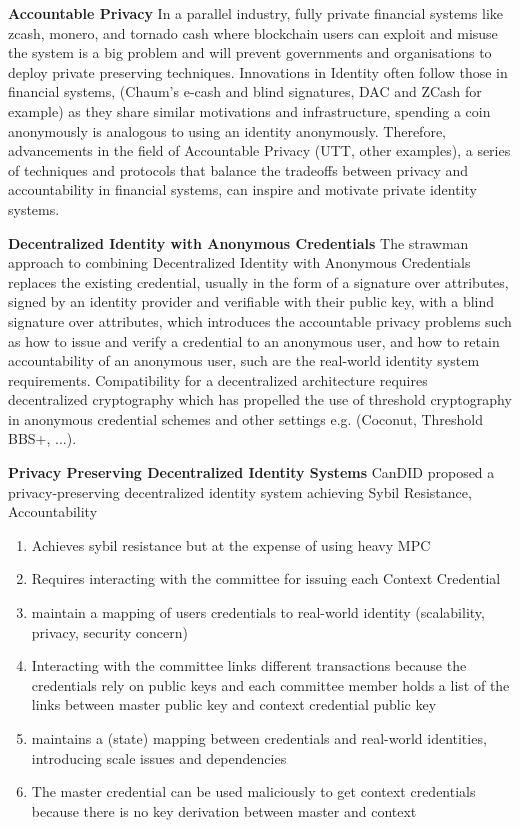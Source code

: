\noindent \textbf{Accountable Privacy}
In a parallel industry, fully private financial systems like zcash, monero, and tornado cash where blockchain users can exploit and misuse the system is a big problem and will prevent governments and organisations to deploy private preserving techniques. Innovations in Identity often follow those in financial systems, (Chaum's e-cash and blind signatures, DAC and ZCash for example) as they share similar motivations and infrastructure, spending a coin anonymously is analogous to using an identity anonymously. Therefore, advancements in the field of Accountable Privacy (UTT, other examples), a series of techniques and protocols that balance the tradeoffs between privacy and accountability in financial systems, can inspire and motivate private identity systems.

\noindent \textbf{Decentralized Identity with Anonymous Credentials}
The strawman approach to combining Decentralized Identity with Anonymous Credentials replaces the existing credential, usually in the form of a signature over attributes, signed by an identity provider and verifiable with their public key, with a blind signature over attributes, which introduces the accountable privacy problems such as how to issue and verify a credential to an anonymous user, and how to retain accountability of an anonymous user, such are the real-world identity system requirements. 
Compatibility for a decentralized architecture requires decentralized cryptography which has propelled the use of threshold cryptography in anonymous credential schemes and other settings e.g. (Coconut, Threshold BBS+, ...). 

\noindent \textbf{Privacy Preserving Decentralized Identity Systems}
CanDID proposed a privacy-preserving decentralized identity system achieving Sybil Resistance, Accountability
\begin{enumerate}
    \item Achieves sybil resistance but at the expense of using heavy MPC
    \item Requires interacting with the committee for issuing each Context Credential
    \item maintain a mapping of users credentials to real-world identity (scalability, privacy, security concern)
    \item Interacting with the committee links different transactions because the credentials rely on public keys and each committee member holds a list of the links between master public key and context credential public key
    \item maintains a (state) mapping between credentials and real-world identities, introducing scale issues and dependencies
    \item The master credential can be used maliciously to get context credentials because there is no key derivation between master and context
\end{enumerate} 

